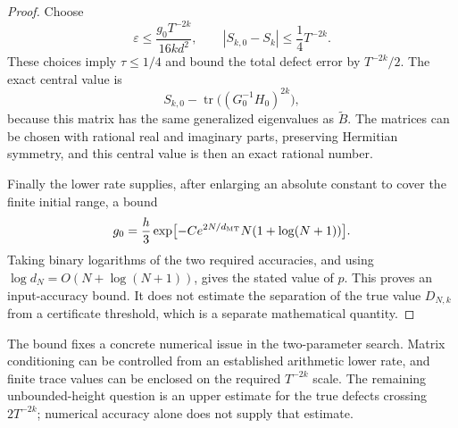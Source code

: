 \begin{proof}
Choose
\[
 \varepsilon\le\frac{g_0T^{-2k}}{16kd^2},
 \qquad
 |S_{k,0}-S_k|\le\frac14T^{-2k}.
\]
These choices imply \(\tau\le1/4\) and bound the total defect
error by \(T^{-2k}/2\). The exact central value is
\[
 S_{k,0}-\operatorname{tr}\bigl((G_0^{-1}H_0)^{2k}\bigr),
\]
because this matrix has the same generalized eigenvalues as
\(\widetilde B\). The matrices can be chosen with rational real
and imaginary parts, preserving Hermitian symmetry, and this central
value is then an exact rational number.

Finally the lower rate supplies, after enlarging an absolute
constant to cover the finite initial range, a bound
\[
 g_0=\frac h3
 \exp\bigl[-C e^{2N/d_{\rm MT}}N(1+\log(N+1))\bigr].
\]
Taking binary logarithms of the two required accuracies, and using
\(\log d_N=O(N+\log(N+1))\), gives the stated value of \(p\).
This proves an input-accuracy bound. It does not estimate the
separation of the true value \(D_{N,k}\) from a certificate
threshold, which is a separate mathematical quantity.
\end{proof}

The bound fixes a concrete numerical issue in the two-parameter
search. Matrix conditioning can be controlled from an established
arithmetic lower rate, and finite trace values can be enclosed on
the required \(T^{-2k}\) scale. The remaining unbounded-height
question is an upper estimate for the true defects crossing
\(2T^{-2k}\); numerical accuracy alone does not supply that estimate.
